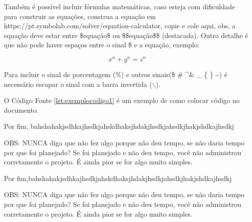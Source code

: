 Também é possível incluir fórmulas matemáticas, caso esteja com dificuldade para construir as equações, construa a equação em https://pt.symbolab.com/solver/equation-calculator, copie e cole aqui, obs, a equação deve estar entre \$equação\$ ou \$\$equação\$\$ (destacada). Outro detalhe é que não pode haver espaços entre o sinal \$ e a equação, exemplo:

$$x^n + y^n = z^n$$

Para incluir o sinal de porcentagem (\%) e outros sinais(\$ \# \^ \space \& \_ \{ \} \~ \space ) é necessário escapar o sinal com a barra invertida ($\backslash$).

O Código Fonte \ref{lst:exemplocodigo1} é um exemplo de como colocar código no documento.






Por fim, bahshahakjsdhkajhsdkjahskdhaksjhdakjhsdkjahsdkjhakjshdkajhsdkj

OBS: NUNCA diga que não fez algo porque não deu tempo, se não daria tempo por que foi planejado? Se foi planejado e não deu tempo, você não administrou corretamente o projeto. É ainda pior se for algo muito simples.




Por fim,bahshahakjsdhkajhsdkjahskdhaksjhdakjhsdkjahsdkjhakjshdkajhsdkj

OBS: NUNCA diga que não fez algo porque não deu tempo, se não daria tempo por que foi planejado? Se foi planejado e não deu tempo, você não administrou corretamente o projeto. É ainda pior se for algo muito simples.


